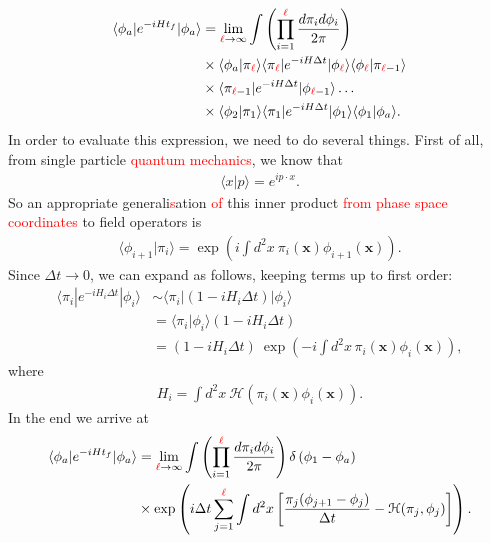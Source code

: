         \begin{align}
            \langle \phi_a| e^{- i H t_f} | \phi_a \rangle &= \lim_{\textcolor{red}{\ell}\rightarrow \infty} \int \left( \prod_{i=1}^{\textcolor{red}{\ell}} \frac{d\pi_i d\phi_i}{2\pi} \right) \nonumber \\
            &\times \langle \phi_a | \pi_{\textcolor{red}{\ell}} \rangle \langle \pi_{\textcolor{red}{\ell}}|  e^{-i H \Delta t}| \phi_{\textcolor{red}{\ell}} \rangle \langle \phi_{\textcolor{red}{\ell}} | \pi_{\textcolor{red}{\ell}-1} \rangle \nonumber \\
            &\times \langle \pi_{\textcolor{red}{\ell}-1} | e^{-i H \Delta t} | \phi_{\textcolor{red}{\ell}-1} \rangle \dots \nonumber \\
            &\times \langle \phi_2 | \pi_1 \rangle \langle \pi_1 | e^{-i H \Delta t} | \phi_1 \rangle \langle \phi_1 |\phi_a \rangle.
        \end{align}
        In order to evaluate this expression, we need to do several things. First of all, from single particle \textcolor{red}{quantum mechanics}, we know that 
        \begin{align}
            \langle x | p \rangle = e^{i p \cdot x}.
        \end{align}
        So an appropriate generali\textcolor{red}{s}ation \textcolor{red}{of} this inner product \textcolor{red}{from phase space coordinates} to field operators is 
        \begin{align}
            \langle \phi_{i+1}| \pi_i \rangle = \exp \left(i \int d^2 x \ \pi_i(\bm{x}) \phi_{i+1}(\bm{x}) \right).
        \end{align}
        Since $\Delta t \rightarrow 0$, we can expand as follows, keeping terms up to first order:
        \begin{align}
            \langle \pi_i | e^{-i H_i \Delta t} | \phi_i \rangle &\sim \langle \pi_i | (1- i H_i \Delta t ) | \phi_i \rangle \nonumber \\
            &= \langle \pi_i | \phi_i \rangle (1 - i H_i \Delta t) \nonumber \\
            & = (1-i H_i \Delta t) \ \exp\left(-i \int d^2x \, \pi_i(\bm{x}) \phi_i (\bm{x})  \right),
        \end{align}
        where
        \begin{align}
            H_i = \int d^2 x \ \mathcal{H}\left(\pi_i (\bm{x}) \phi_i (\bm{x}) \right).
        \end{align}
        In the end we arrive at 
        \begin{align}
            \langle \phi_a | e^{-i H t_f} | \phi_a \rangle &= \lim_{\textcolor{red}{\ell}\rightarrow \infty} \int \left( \prod_{i=1}^{\textcolor{red}{\ell}} \frac{d \pi_i d\phi_i}{2\pi} \right) \delta \left(\phi_1 -\phi_a \right) \nonumber \\
            &\times \exp \left(i \Delta t \sum_{j=1}^{\textcolor{red}{\ell}} \int d^2x \left[\frac{\pi_j (\phi_{j+1} -\phi_j)}{\Delta t} - \mathcal{H}(\pi_j, \phi_j) \right] \right).
        \end{align}
